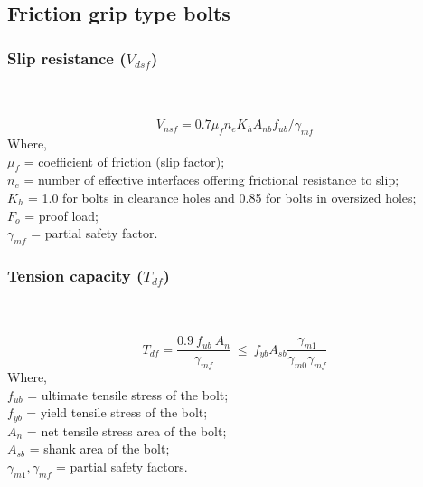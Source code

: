 \documentclass[11.5pt,a4paper,oneside]{report}
\begin{document}
\begin{Form}
\subsection{Friction grip type bolts}
\subsubsection{Slip resistance (\boldmath $V_{dsf}$)}
\qquad \qquad [Reference: Cl. 10.4.3, IS 800:2007] \\ \\
\begin{equation}
	V_{nsf} = 0.7 \mu_f n_e  K_h A_{nb} f_{ub} / \gamma_{mf}
\end{equation}
Where, \\
\indent $\mu_f$ = coefficient of friction (slip factor); \\
\indent $n_e$ = number of effective interfaces offering frictional resistance to slip; \\
\indent $K_h$ = 1.0 for bolts in clearance holes and 0.85 for bolts in oversized holes; \\
\indent $F_o$ = proof load; \\
\indent $\gamma_{mf}$ = partial safety factor.
\subsubsection{Tension capacity (\boldmath $T_{df}$)}
\qquad \qquad [Reference: Cl. 10.4.5, IS 800:2007] \\ \\
\begin{equation}
T_{df} = \frac{0.9~ f_{ub}~ A_n}{\gamma_{mf}} ~\leq~ f_{yb} A_{sb}  \frac{\gamma_{m1}}{\gamma_{m0} \gamma_{mf}}
\end{equation}
Where, \\
\indent $f_{ub}$ = ultimate tensile stress of the bolt; \\
\indent $f_{yb}$ = yield tensile stress of the bolt; \\
\indent $A_n$ = net tensile stress area of the bolt; \\
\indent $A_{sb}$ = shank area of the bolt; \\
\indent $\gamma_{m1}, \gamma_{mf}$ = partial safety factors. \\


\end{Form}
\end{document}
